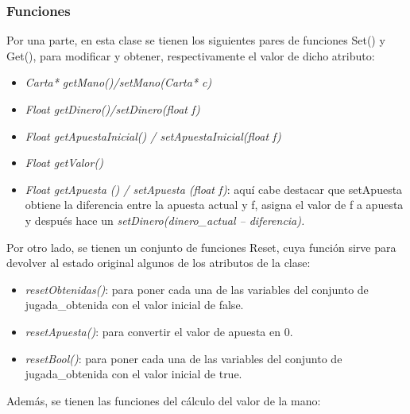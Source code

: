 \subsubsection{Funciones}
Por una parte, en esta clase se tienen los siguientes pares de funciones Set() y Get(), para modificar y obtener, respectivamente el valor de dicho atributo:
\begin{itemize}
\item \textit{Carta* getMano()/setMano(Carta* c)}
\item \textit{Float getDinero()/setDinero(float f)}
\item\textit{ Float getApuestaInicial() / setApuestaInicial(float f)}
\item \textit{Float getValor()}
\item \textit{Float getApuesta () / setApuesta (float f)}: aquí cabe destacar que setApuesta obtiene la diferencia entre la apuesta actual y f, asigna el valor de f a apuesta y después hace un \textit{setDinero(dinero\_actual – diferencia).}
 \end{itemize}
Por otro lado, se tienen un conjunto de funciones Reset, cuya función sirve para devolver al estado original algunos de los atributos de la clase:
\begin{itemize}
\item \textit{resetObtenidas()}: para poner cada una de las variables del conjunto de jugada\_obtenida con el valor inicial de false.
\item \textit{ resetApuesta()}: para convertir el valor de apuesta en 0.
\item \textit{resetBool()}: para poner cada una de las variables del conjunto de jugada\_obtenida con el valor inicial de true.
 \end{itemize}
Además, se tienen las funciones del cálculo del valor de la mano:
